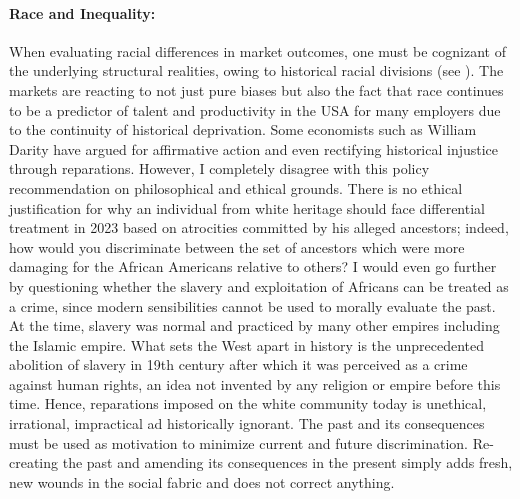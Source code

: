 \documentclass[12pt]{article}
\newcommand{\1}{\mathbbm 1}
\begin{document}
	    
	    
	    
	    
	    \paragraph{Race and Inequality:}
	    When evaluating racial differences in market outcomes, one must be cognizant of the underlying structural realities, owing to historical racial divisions (see \cite{darity2006economics}). The markets are reacting to not just pure biases but also the fact that race continues to be a predictor of talent and productivity in the USA for many employers due to the continuity of historical deprivation. Some economists such as William Darity have argued for affirmative action \cite{darity2005affirmative} and even rectifying historical injustice through reparations. However, I completely disagree with this policy recommendation on philosophical and ethical grounds. There is no ethical justification for why an individual from white heritage should face differential treatment in 2023 based on atrocities committed by his alleged ancestors; indeed, how would you discriminate between the set of ancestors which were more damaging for the African Americans relative to others? I would even go further by questioning whether the slavery and exploitation of Africans can be treated as a crime, since modern sensibilities cannot be used to morally evaluate the past. At the time, slavery was normal and practiced by many other empires including the Islamic empire. What sets the West apart in history is the unprecedented abolition of slavery in 19th century after which it was perceived as a crime against human rights, an idea not invented by any religion or empire before this time. Hence, reparations imposed on the white community today is unethical, irrational, impractical ad historically ignorant. The past and its consequences must be used as motivation to minimize current and future discrimination. Re-creating the past and amending its consequences in the present simply adds fresh, new wounds in the social fabric and does not correct anything.
	    
	    
	    
	    
	    
\end{document}
